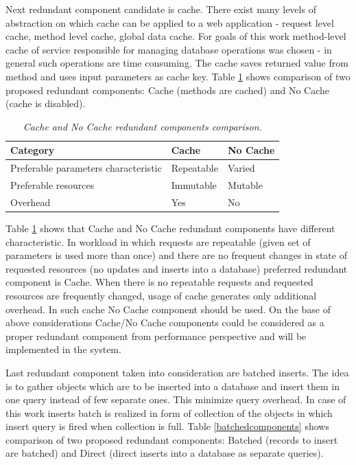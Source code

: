 \documentclass[12pt,a4paper]{article}
\begin{document}
Next redundant component candidate is cache. There exist many levels of abstraction on which cache can be applied to a web application - request level cache, method level cache, global data cache. For goals of this work method-level cache of service responsible for managing database operations was chosen - in general such operations are time consuming. The cache saves returned value from method and uses input parameters as cache key. Table \ref{cachecomponents} shows comparison of two proposed redundant components: Cache (methods are cached) and No Cache (cache is disabled).
\begin{table}[!htb]
\def\arraystretch{1.5}
\caption{\textit{Cache and No Cache redundant components comparison.}}\label{cachecomponents}
\begin{tabularx}{\textwidth}{p{6cm}|X|X}
  \textbf{Category} &\textbf{Cache} & \textbf{No Cache} \\
\hline
Preferable parameters characteristic & Repeatable & Varied \\
Preferable resources & Immutable & Mutable\\
Overhead & Yes & No\\
\end{tabularx}
\end{table}
 
Table \ref{cachecomponents} shows that Cache and No Cache redundant components have different characteristic. In workload in which requests are repeatable (given set of parameters is used more than once) and there are no frequent changes in state of requested resources (no updates and inserts into a database) preferred redundant component is Cache. When there is no repeatable requests and requested resources are frequently changed, usage of cache generates only additional overhead. In such cache No Cache component should be used. On the base of above considerations Cache/No Cache components could be considered as a proper redundant component from performance perspective and will be implemented in the system. 

Last redundant component taken into consideration are batched inserts. The idea is to gather objects which are to be inserted into a database and insert them in one query instead of few separate ones. This minimize query overhead. In case of this work inserts batch is realized in form of collection of the objects in which insert query is fired when collection is full.   
Table \ref{batchedcomponents} shows comparison of two proposed redundant components: Batched (records to insert are batched) and Direct (direct inserts into a database as separate queries).
\end{document}

